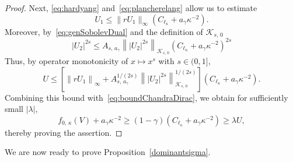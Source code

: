 \documentclass[10pt]{amsart}
\theoremstyle{definition}
\newcommand*\cK{\mathcal{K}}
\begin{document}
\begin{proof}
Next, \eqref{eq:hardyang} and~\eqref{eq:plancherelang} allow us to estimate
\begin{equation}
U_1 \leq \|rU_1\|_\infty \left(C_{\ell_\kappa}+a_\gamma \kappa^{-2}\right).
\end{equation}
Moreover, by~\eqref{eq:genSobolevDual} and the definition of $\cK_{s,\,0}$
\[
|U_2|^{2s}
\leq A_{s,\,a_\gamma}\left\||U_2|^{2s}\right\|_{\cK_{s,\,0}}\left(C_{\ell_\kappa} +a_\gamma \kappa^{-2}\right)^{2s}
\]
Thus, by operator monotonicity of $x\mapsto x^s$ with $s\in(0,1]$,
\[
U \leq
\left[\left\|rU_1\right\|_\infty+A_{s,\,a_\gamma}^{1/(2s)}\left\||U_2|^{2s}\right\|_{\cK_{s,\,0}}^{1/(2s)}\right] \left(C_{\ell_\kappa}+a_\gamma \kappa^{-2}\right).
\]
Combining this bound with~\eqref{eq:boundChandraDirac}, we obtain for sufficiently small $|\lambda|$,
\[
f_{0,\,\kappa}(V)+a_\gamma \kappa^{-2}
\geq (1-\gamma)\left(C_{\ell_\kappa}+a_\gamma \kappa^{-2}\right)
\geq \lambda U,
\]
thereby proving the assertion.
\end{proof}

We are now ready to prove Proposition~\ref{dominantsigma}.
\end{document}

